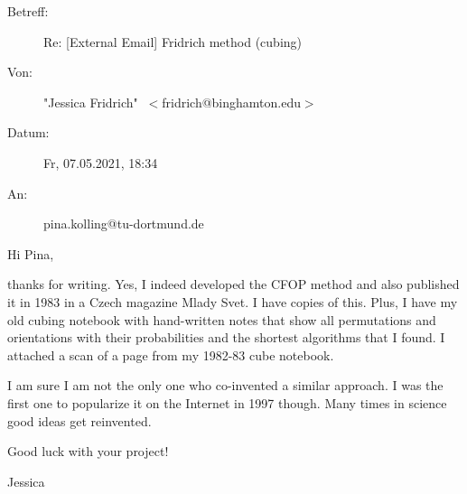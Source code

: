 \documentclass[12pt,a4paper, usenames, dvipsnames]{article}
\theoremstyle{mystyle}
\theoremstyle{definition}
\begin{document}
\begin{flushleft}\ttfamily

\begin{description}
\item[Betreff:]  Re: [External Email] Fridrich method (cubing)
\item[Von:] "Jessica Fridrich"  $\ <$fridrich@binghamton.edu$>$
\item[Datum: ] Fr, 07.05.2021, 18:34
\item[An:] pina.kolling@tu-dortmund.de
\end{description}

Hi Pina,

thanks for writing. Yes, I indeed developed the CFOP method and also
published it in 1983 in a Czech magazine Mlady Svet. I have copies of this.
Plus, I have my old cubing notebook with hand-written notes that show all
permutations and orientations with their probabilities and the shortest
algorithms that I found. I attached a scan of a page from my 1982-83 cube
notebook.

I am sure I am not the only one who co-invented a similar approach. I was
the first one to popularize it on the Internet in 1997 though. Many times
in science good ideas get reinvented.

Good luck with your project!

Jessica 
\end{flushleft}






%
%
%
%
%
%
%
%
%
%
%
%
%
%
%
%
%
%
%
\end{document}
